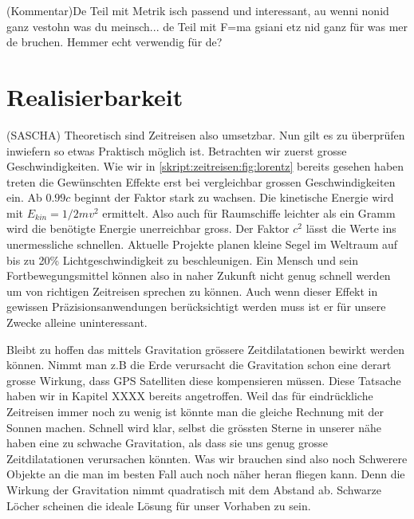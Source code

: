 \begin{refsection}
    (Kommentar)De Teil mit Metrik isch passend und interessant, au wenni nonid ganz vestohn was du meinsch... de Teil mit F=ma gsiani etz nid ganz für was mer de bruchen. Hemmer echt verwendig für de?
	\section{Realisierbarkeit}
    
    (SASCHA)
    Theoretisch sind Zeitreisen also umsetzbar. Nun gilt es zu überprüfen inwiefern so etwas Praktisch möglich ist. Betrachten wir zuerst grosse Geschwindigkeiten. Wie wir in \ref{skript:zeitreisen:fig:lorentz} bereits gesehen haben treten die Gewünschten Effekte erst bei vergleichbar grossen Geschwindigkeiten ein. Ab $0.99c$ beginnt der Faktor stark zu wachsen.  Die kinetische Energie wird mit $E_{kin}=1/2mv^2$ ermittelt. Also auch für Raumschiffe leichter als ein Gramm wird die benötigte Energie unerreichbar gross. Der Faktor $c^2$ lässt die Werte ins unermessliche schnellen.
    Aktuelle Projekte planen kleine Segel im Weltraum auf bis zu 20\% Lichtgeschwindigkeit zu beschleunigen. Ein Mensch und sein Fortbewegungsmittel können also in naher Zukunft nicht genug schnell werden um von richtigen Zeitreisen sprechen zu können. Auch wenn dieser Effekt in gewissen Präzisionsanwendungen berücksichtigt werden muss ist er für unsere Zwecke alleine uninteressant.
    
    Bleibt zu hoffen das mittels Gravitation grössere Zeitdilatationen bewirkt werden können. Nimmt man z.B die Erde verursacht die Gravitation schon eine derart grosse Wirkung, dass GPS Satelliten diese kompensieren müssen. Diese Tatsache haben wir in Kapitel  XXXX bereits angetroffen. Weil das für eindrückliche Zeitreisen immer noch zu wenig ist könnte man die gleiche Rechnung mit der Sonnen machen. Schnell wird klar, selbst die grössten Sterne in unserer nähe haben eine zu schwache Gravitation, als dass sie uns genug grosse Zeitdilatationen verursachen könnten. Was wir brauchen sind also noch Schwerere Objekte an die man im besten Fall auch noch näher heran fliegen kann. Denn die Wirkung der Gravitation nimmt quadratisch mit dem Abstand ab. Schwarze Löcher scheinen die ideale Lösung für unser Vorhaben zu sein.
    

\end{refsection}
